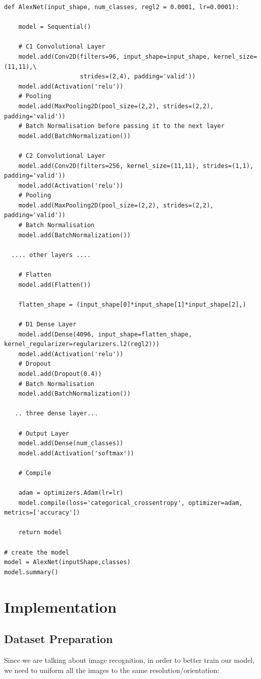 \documentclass{article}
\begin{document}
\begin{verbatim}
def AlexNet(input_shape, num_classes, regl2 = 0.0001, lr=0.0001):
    
    model = Sequential()

    # C1 Convolutional Layer 
    model.add(Conv2D(filters=96, input_shape=input_shape, kernel_size=(11,11),\
                     strides=(2,4), padding='valid'))
    model.add(Activation('relu'))
    # Pooling
    model.add(MaxPooling2D(pool_size=(2,2), strides=(2,2), padding='valid'))
    # Batch Normalisation before passing it to the next layer
    model.add(BatchNormalization())

    # C2 Convolutional Layer
    model.add(Conv2D(filters=256, kernel_size=(11,11), strides=(1,1), padding='valid'))
    model.add(Activation('relu'))
    # Pooling
    model.add(MaxPooling2D(pool_size=(2,2), strides=(2,2), padding='valid'))
    # Batch Normalisation
    model.add(BatchNormalization())

  .... other layers ....

    # Flatten
    model.add(Flatten())

    flatten_shape = (input_shape[0]*input_shape[1]*input_shape[2],)
    
    # D1 Dense Layer
    model.add(Dense(4096, input_shape=flatten_shape, kernel_regularizer=regularizers.l2(regl2)))
    model.add(Activation('relu'))
    # Dropout
    model.add(Dropout(0.4))
    # Batch Normalisation
    model.add(BatchNormalization())

   .. three dense layer...
   
    # Output Layer
    model.add(Dense(num_classes))
    model.add(Activation('softmax'))

    # Compile

    adam = optimizers.Adam(lr=lr)
    model.compile(loss='categorical_crossentropy', optimizer=adam, metrics=['accuracy'])

    return model
 
# create the model
model = AlexNet(inputShape,classes)
model.summary()
\end{verbatim}

 \section{Implementation}
 
 \subsection{Dataset Preparation}
 Since we are talking about image recognition, in order to better train our model, we need to uniform all the images to the same resolution/orientation:
 
\end{document}
